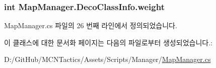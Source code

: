 \subsubsection[{\texorpdfstring{weight}{weight}}]{\setlength{\rightskip}{0pt plus 5cm}int Map\+Manager.\+Deco\+Class\+Info.\+weight}\hypertarget{class_map_manager_1_1_deco_class_info_a37049aed98cee0f82b631a6273e3a27b}{}\label{class_map_manager_1_1_deco_class_info_a37049aed98cee0f82b631a6273e3a27b}


Map\+Manager.\+cs 파일의 26 번째 라인에서 정의되었습니다.



이 클래스에 대한 문서화 페이지는 다음의 파일로부터 생성되었습니다.\+:\begin{DoxyCompactItemize}
\item 
D\+:/\+Git\+Hub/\+M\+C\+N\+Tactics/\+Assets/\+Scripts/\+Manager/\hyperlink{_map_manager_8cs}{Map\+Manager.\+cs}\end{DoxyCompactItemize}
